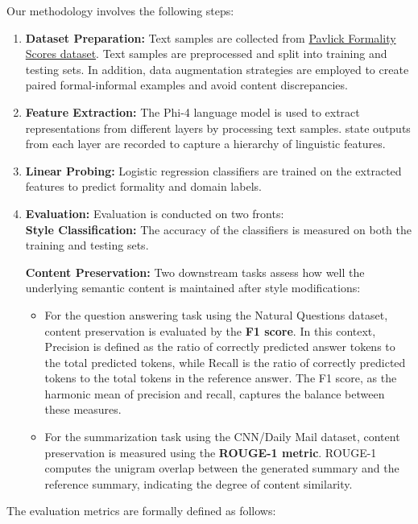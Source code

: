 \documentclass{article}
\begin{document}
Our methodology involves the following steps:
\begin{enumerate}
    \item \textbf{Dataset Preparation:} Text samples are collected from \href{https://huggingface.co/datasets/osyvokon/pavlick-formality-scores}{Pavlick Formality Scores dataset}. Text samples are preprocessed and split into training and testing sets. In addition, data augmentation strategies are employed to create paired formal-informal examples and avoid content discrepancies.
    \item \textbf{Feature Extraction:} The Phi-4 language model is used to extract representations from different layers by processing text samples. state outputs from each layer are recorded to capture a hierarchy of linguistic features.
    \item \textbf{Linear Probing:} Logistic regression classifiers are trained on the extracted features to predict formality and domain labels.
    \item \textbf{Evaluation:}     Evaluation is conducted on two fronts:\\
    \textbf{Style Classification:}
        The accuracy of the classifiers is measured on both the training and testing sets.

    \textbf{Content Preservation:}
        Two downstream tasks assess how well the underlying semantic content is maintained after style modifications:
        \begin{itemize}
            \item For the question answering task using the Natural Questions dataset, content preservation is evaluated by the \textbf{F1 score}. In this context, Precision is defined as the ratio of correctly predicted answer tokens to the total predicted tokens, while Recall is the ratio of correctly predicted tokens to the total tokens in the reference answer. The F1 score, as the harmonic mean of precision and recall, captures the balance between these measures.
            \item For the summarization task using the CNN/Daily Mail dataset, content preservation is measured using the \textbf{ROUGE-1 metric}. ROUGE-1 computes the unigram overlap between the generated summary and the reference summary, indicating the degree of content similarity.
        \end{itemize}
\end{enumerate}

The evaluation metrics are formally defined as follows:
\end{document}

